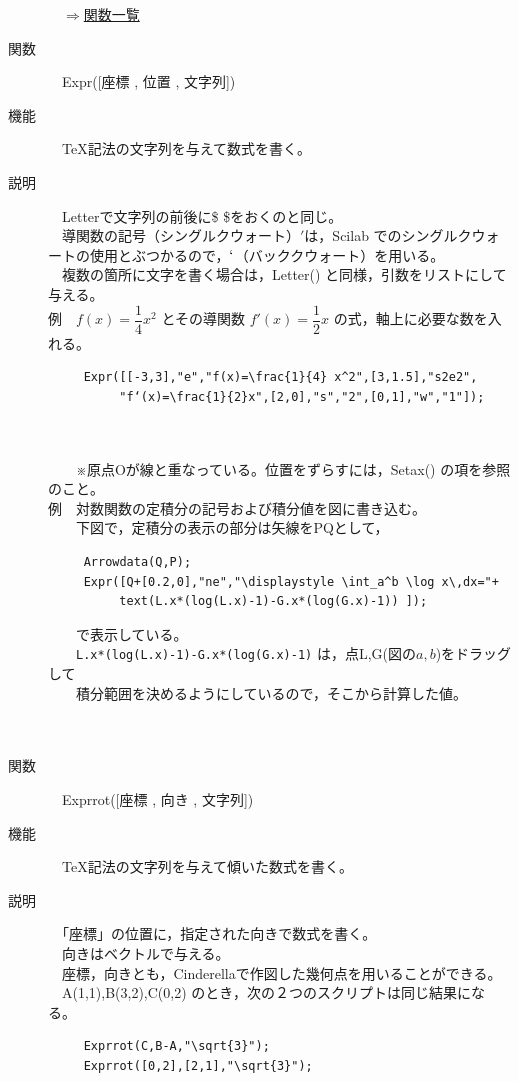 \documentclass[papersize,a4paper,12pt,uplatex]{jsarticle}
\begin{document}
\begin{description}
\begin{flushright}　\hyperlink{functionlist}{$\Rightarrow$関数一覧}\end{flushright}

\hypertarget{expr}{}
\item[関数]　Expr([座標 , 位置 , 文字列])
\item[機能]　\TeX 記法の文字列を与えて数式を書く。
\item[説明]　Letterで文字列の前後に\$ \$をおくのと同じ。\\
　導関数の記号（シングルクウォート）$'$は，Scilab でのシングルクウォートの使用とぶつかるので，$`$（バッククウォート）を用いる。\\
　複数の箇所に文字を書く場合は，Letter() と同様，引数をリストにして与える。\\

例　$f(x)=\dfrac{1}{4} x^2$  とその導関数 $f'(x)=\dfrac{1}{2} x$ の式，軸上に必要な数を入れる。
\begin{verbatim}
　　　Expr([[-3,3],"e","f(x)=\frac{1}{4} x^2",[3,1.5],"s2e2",
　　　　　　"f‘(x)=\frac{1}{2}x",[2,0],"s","2",[0,1],"w","1"]);
\end{verbatim}
　\\
　　　　　\\

　　※原点Oが線と重なっている。位置をずらすには，Setax() の項を参照のこと。\\

例　対数関数の定積分の記号および積分値を図に書き込む。\\
　　下図で，定積分の表示の部分は矢線をPQとして，
\begin{verbatim}
　　　Arrowdata(Q,P);
　　　Expr([Q+[0.2,0],"ne","\displaystyle \int_a^b \log x\,dx="+
　　　　　　text(L.x*(log(L.x)-1)-G.x*(log(G.x)-1)) ]);
\end{verbatim}
　　で表示している。\\
　　\verb|L.x*(log(L.x)-1)-G.x*(log(G.x)-1)| は，点L,G(図の$a,b$)をドラッグして\\
　　積分範囲を決めるようにしているので，そこから計算した値。\\
\\

　　　　　

\hypertarget{exprrot}{}
\item[関数]　Exprrot([座標 , 向き , 文字列])
\item[機能]　\TeX 記法の文字列を与えて傾いた数式を書く。
\item[説明]　「座標」の位置に，指定された向きで数式を書く。\\
　向きはベクトルで与える。\\
　座標，向きとも，Cinderellaで作図した幾何点を用いることができる。\\
　A(1,1),B(3,2),C(0,2) のとき，次の２つのスクリプトは同じ結果になる。
\begin{verbatim}
　　　Exprrot(C,B-A,"\sqrt{3}"); 
　　　Exprrot([0,2],[2,1],"\sqrt{3}"); 
\end{verbatim}
　\\


\end{description}
\end{document}
